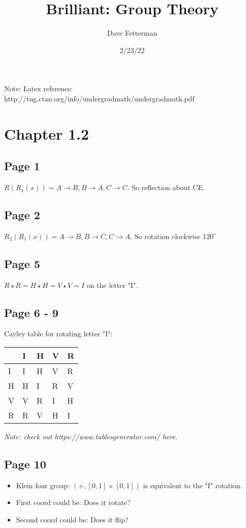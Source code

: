 \documentclass[11pt, oneside]{article}   	%
\title{Brilliant: Group Theory}
\author{Dave Fetterman}
\date{2/23/22}							%
\begin{document}
\maketitle
Note: Latex reference: http://tug.ctan.org/info/undergradmath/undergradmath.pdf
\section{Chapter 1.2}
\subsection{Page 1}
$R (R_1 (x) ) = A \rightarrow B, B \rightarrow A, C \rightarrow C$.
So reflection about CE.

\subsection{Page 2}
$R_2 (R_1 (x) ) = A \rightarrow B, B \rightarrow C, C \rightarrow A$.
So rotation clockwise ${120^\circ}$

\subsection{Page 5}
$ R \star R = H \star H = V \star V = I $ on the letter "I".


\subsection {Page 6 - 9}
Cayley table for rotating letter "I":

\begin{tabular}{|l|l|l|l|l|}
\hline
  & I & H & V & R \\ \hline
I & I & H & V & R \\ \hline
H & H & I & R & V \\ \hline
V & V & R & I & H \\ \hline
R & R & V & H & I \\ \hline
\end{tabular}

\emph{Note: check out https://www.tablesgenerator.com/ here.}


\subsection {Page 10}

\begin{itemize}
\item Klein four group: $ (+, [0, 1] \times [0, 1]) $ is equivalent to the "I" rotation.  

\item First coord could be: Does it rotate?
\item Second coord could be: Does it flip?
\end{itemize}
\end{document}
